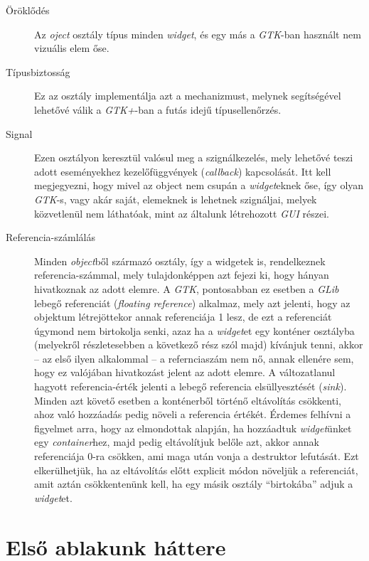 \documentclass[a4paper,10pt]{article}
\begin{document}
\begin{description}
 \item[Öröklődés] Az \textit{oject} osztály típus minden \textit{widget}, és egy más a \textit{GTK}-ban használt nem vizuális elem őse.

 \item[Típusbiztosság] Ez az osztály implementálja azt a mechanizmust, melynek segítségével lehetővé válik a \textit{GTK+}-ban a futás idejű típusellenőrzés.

 \item[Signal] Ezen osztályon keresztül valósul meg a szignálkezelés, mely lehetővé teszi adott eseményekhez kezelőfüggvények (\textit{callback}) kapcsolását. Itt kell megjegyezni, hogy mivel az object nem csupán a \textit{widget}eknek őse, így olyan \textit{GTK}-s, vagy akár saját, elemeknek is lehetnek szignáljai, melyek közvetlenül nem láthatóak, mint az általunk létrehozott \textit{GUI} részei.

 \item[Referencia-számlálás] Minden \textit{object}ből származó osztály, így a widgetek is, rendelkeznek referencia-számmal, mely tulajdonképpen azt fejezi ki, hogy hányan hivatkoznak az adott elemre. A \textit{GTK}, pontosabban ez esetben a \textit{GLib} lebegő referenciát (\textit{floating reference}) alkalmaz, mely azt jelenti, hogy az objektum létrejöttekor annak referenciája 1 lesz, de ezt a referenciát úgymond nem birtokolja senki, azaz ha a \textit{widget}et egy konténer osztályba (melyekről részletesebben a következő rész szól majd) kívánjuk tenni, akkor -- az első ilyen alkalommal -- a refernciaszám nem nő, annak ellenére sem, hogy ez valójában hivatkozást jelent az adott elemre. A változatlanul hagyott referencia-érték jelenti a lebegő referencia elsüllyesztését (\textit{sink}). Minden azt követő esetben a konténerből történő eltávolítás csökkenti, ahoz való hozzáadás pedig növeli a referencia értékét. Érdemes felhívni a figyelmet arra, hogy az elmondottak alapján, ha hozzáadtuk \textit{widget}ünket egy \textit{container}hez, majd pedig eltávolítjuk belőle azt, akkor annak referenciája 0-ra csökken, ami maga után vonja a destruktor lefutását. Ezt elkerülhetjük, ha az eltávolítás előtt explicit módon növeljük a referenciát, amit aztán csökkentenünk kell, ha egy másik osztály ``birtokába'' adjuk a \textit{widget}et.
\end{description}

\section{Első ablakunk háttere}
\end{document}
